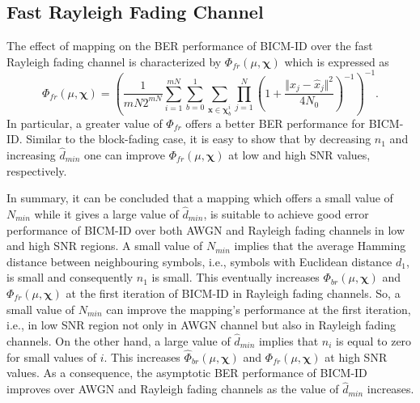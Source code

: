 \documentclass[12pt, draftclsnofoot, onecolumn]{IEEEtran}
\newcommand{\mb}[1]{\boldsymbol{#1}}
\begin{document}
\subsection{Fast Rayleigh Fading Channel}
The effect of mapping  on the BER performance of BICM-ID over the fast Rayleigh fading channel is characterized by $\Phi_{fr}(\mu, \mb{\chi})$ which is expressed as  \cite{hypercub_conf} \color{black}
\begin{equation} 
\Phi_{fr}(\mu, \mb{\chi}) = \left( \dfrac{1}{mN2^{mN}}\sum_{i=1}^{mN} \sum_{b=0}^{1} \sum_{{\mb x}\in \mb{\chi}_{b}^{i}} \prod_{j = 1}^{N} \left( 1 + \dfrac{\Vert {x_{j}}- \hat{x}_{j} \Vert^{2}}{4N_{0}}\right) ^{-1}\right) ^{-1}.
\end{equation} In particular, a   greater value of $\Phi_{fr}$ offers a better BER performance for BICM-ID. Similar to the   block-fading \color{black} case, it is easy to show that by decreasing $n_{1}$ and increasing $\hat{d}_{min}$ one can improve $\Phi_{fr}(\mu, \mb{\chi})$ at low and high SNR values, respectively.

\color{black}


In summary, it can be concluded that a mapping which offers a small value of $N_{min}$ while it gives a large value of $\hat{d}_{min}$, is suitable to achieve good error performance of BICM-ID  over both AWGN and Rayleigh fading channels in low and high  SNR regions. A small value of $N_{min}$ implies that the average Hamming distance between neighbouring  symbols, i.e., symbols with Euclidean distance $d_{1}$, is small and consequently  $n_{1}$ is small. This eventually increases $\Phi_{br}(\mu, \mb{\chi})$ and $\Phi_{fr}(\mu, \mb{\chi})$ at the first iteration of BICM-ID in Rayleigh fading channels. So, a small value   of $N_{min}$ can improve the mapping's performance at the first iteration, i.e., in low SNR region not only in AWGN channel but also in Rayleigh fading channels. 
On the other hand, a large value of $\hat{d}_{min}$ implies that $n_{i}$ is equal to zero for small values of $i$. This increases  $\hat{\Phi}_{br}(\mu, \mb{\chi})$ and $\Phi_{fr}(\mu, \mb{\chi})$ at high SNR values.  As a consequence, the asymptotic BER performance of BICM-ID improves over  AWGN and Rayleigh fading channels as the value of   $\hat{d}_{min}$ increases. 
\end{document}
